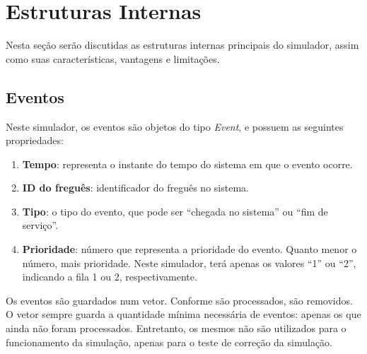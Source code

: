 \documentclass[a4paper,12pt]{report}
\begin{document}
\section{Estruturas Internas}

Nesta seção serão discutidas as estruturas internas principais do simulador, assim como suas características, vantagens e limitações.

\subsection{Eventos}
Neste simulador, os eventos são objetos do tipo \emph{Event}, e possuem as seguintes propriedades:
\begin{enumerate}
	\itemsep1em
	\item \textbf{Tempo}: representa o instante do tempo do sistema em que o evento ocorre.
    \item \textbf{ID do freguês}: identificador do freguês no sistema.
    \item \textbf{Tipo}: o tipo do evento, que pode ser ``chegada no sistema'' ou ``fim de serviço''.
    \item \textbf{Prioridade}: número que representa a prioridade do evento. Quanto menor o número, mais prioridade. Neste simulador, terá apenas os valores ``1'' ou ``2'', indicando a fila 1 ou 2, respectivamente.
\end{enumerate}

Os eventos são guardados num vetor. Conforme são processados, são removidos. O vetor sempre guarda a quantidade mínima necessária de eventos: apenas os que ainda não foram processados. Entretanto, os mesmos não são utilizados para o funcionamento da simulação, apenas para o teste de correção da simulação. 
\end{document}
